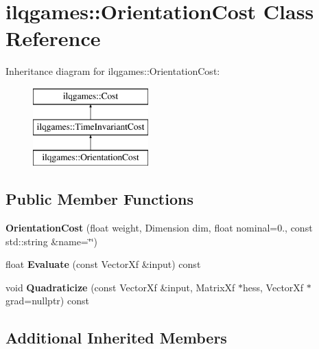 \hypertarget{classilqgames_1_1_orientation_cost}{}\section{ilqgames\+:\+:Orientation\+Cost Class Reference}
\label{classilqgames_1_1_orientation_cost}
Inheritance diagram for ilqgames\+:\+:Orientation\+Cost\+:\begin{figure}[H]
\begin{center}
\leavevmode
\includegraphics[height=3.000000cm]{classilqgames_1_1_orientation_cost}
\end{center}
\end{figure}
\subsection*{Public Member Functions}
\begin{DoxyCompactItemize}
\item 
{\bfseries Orientation\+Cost} (float weight, Dimension dim, float nominal=0., const std\+::string \&name=\char`\"{}\char`\"{})\hypertarget{classilqgames_1_1_orientation_cost_a9a63ce77337909590ea8fcfe164145f7}{}\label{classilqgames_1_1_orientation_cost_a9a63ce77337909590ea8fcfe164145f7}

\item 
float {\bfseries Evaluate} (const Vector\+Xf \&input) const \hypertarget{classilqgames_1_1_orientation_cost_a8003d9ccc4642698d6782901396b68d8}{}\label{classilqgames_1_1_orientation_cost_a8003d9ccc4642698d6782901396b68d8}

\item 
void {\bfseries Quadraticize} (const Vector\+Xf \&input, Matrix\+Xf $\ast$hess, Vector\+Xf $\ast$grad=nullptr) const \hypertarget{classilqgames_1_1_orientation_cost_affc18134014c7a7a0f66b5fb236b9543}{}\label{classilqgames_1_1_orientation_cost_affc18134014c7a7a0f66b5fb236b9543}

\end{DoxyCompactItemize}
\subsection*{Additional Inherited Members}


